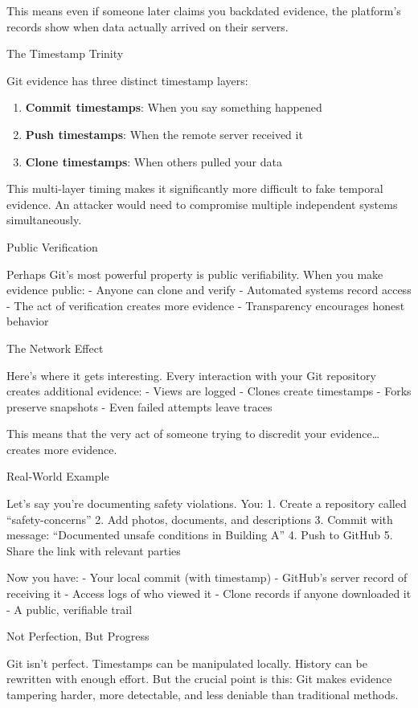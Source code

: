 This means even if someone later claims you backdated evidence, the
platform's records show when data actually arrived on their servers.

The Timestamp Trinity

Git evidence has three distinct timestamp layers:

\begin{enumerate}
\def\labelenumi{\arabic{enumi}.}
\tightlist
\item
  \textbf{Commit timestamps}: When you say something happened
\item
  \textbf{Push timestamps}: When the remote server received it
\item
  \textbf{Clone timestamps}: When others pulled your data
\end{enumerate}

This multi-layer timing makes it significantly more difficult to fake
temporal evidence. An attacker would need to compromise multiple
independent systems simultaneously.

Public Verification

Perhaps Git's most powerful property is public verifiability. When you
make evidence public: - Anyone can clone and verify - Automated systems
record access - The act of verification creates more evidence -
Transparency encourages honest behavior

The Network Effect

Here's where it gets interesting. Every interaction with your Git
repository creates additional evidence: - Views are logged - Clones
create timestamps - Forks preserve snapshots - Even failed attempts
leave traces

This means that the very act of someone trying to discredit your
evidence\ldots{} creates more evidence.

Real-World Example

Let's say you're documenting safety violations. You: 1. Create a
repository called ``safety-concerns'' 2. Add photos, documents, and
descriptions 3. Commit with message: ``Documented unsafe conditions in
Building A'' 4. Push to GitHub 5. Share the link with relevant parties

Now you have: - Your local commit (with timestamp) - GitHub's server
record of receiving it - Access logs of who viewed it - Clone records if
anyone downloaded it - A public, verifiable trail

Not Perfection, But Progress

Git isn't perfect. Timestamps can be manipulated locally. History can be
rewritten with enough effort. But the crucial point is this: Git makes
evidence tampering harder, more detectable, and less deniable than
traditional methods.

